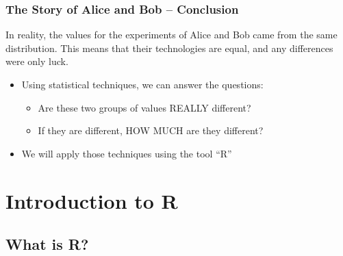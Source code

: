 \documentclass[10pt]{beamer}
\begin{document}
\begin{frame}
  \frametitle{The Story of Alice and Bob -- Conclusion}
  \begin{block}{}
    In reality, the values for the experiments of Alice and Bob came
    from the same distribution. This means that their technologies are
    equal, and any differences were only luck.
  \end{block}
  \bigskip
  
  \begin{itemize}
  \item Using statistical techniques, we can answer the questions:
    \begin{itemize}
    \item Are these two groups of values REALLY different?
    \item If they are different, HOW MUCH are they different?
    \end{itemize}
  \item We will apply those techniques using the tool ``R''
  \end{itemize}
\end{frame}

\section{Introduction to R}
\subsection{What is R?}
\end{document}
